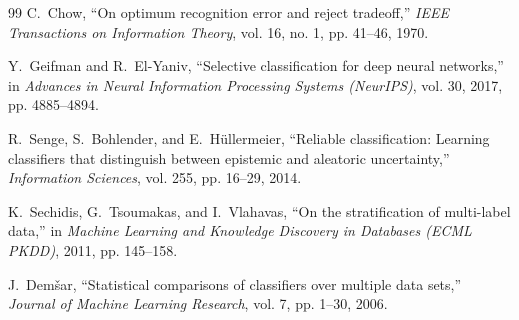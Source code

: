 \documentclass[11pt,a4paper]{article}
\begin{document}
\begin{thebibliography}{99}
C.~Chow,
\newblock ``On optimum recognition error and reject tradeoff,''
\newblock \textit{IEEE Transactions on Information Theory}, vol. 16, no. 1, pp. 41--46, 1970.

Y.~Geifman and R.~El-Yaniv,
\newblock ``Selective classification for deep neural networks,''
\newblock in \textit{Advances in Neural Information Processing Systems (NeurIPS)}, vol. 30, 2017, pp. 4885--4894.

R.~Senge, S.~Bohlender, and E.~H\"ullermeier,
\newblock ``Reliable classification: Learning classifiers that distinguish between epistemic and aleatoric uncertainty,''
\newblock \textit{Information Sciences}, vol. 255, pp. 16--29, 2014.

K.~Sechidis, G.~Tsoumakas, and I.~Vlahavas,
\newblock ``On the stratification of multi-label data,''
\newblock in \textit{Machine Learning and Knowledge Discovery in Databases (ECML PKDD)}, 2011, pp. 145--158.

J.~Dem\v{s}ar,
\newblock ``Statistical comparisons of classifiers over multiple data sets,''
\newblock \textit{Journal of Machine Learning Research}, vol. 7, pp. 1--30, 2006.

\end{thebibliography}
\end{document}
